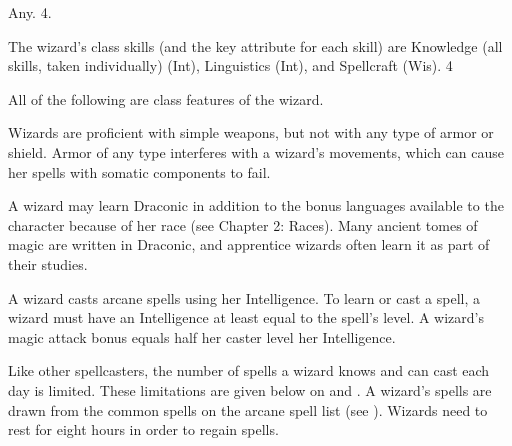  Any.
 4.

The wizard's class skills (and the key attribute for each skill) are
Knowledge (all skills, taken individually) (Int), Linguistics (Int), and Spellcraft (Wis).
 4


All of the following are class features of the wizard.

 Wizards are proficient with simple weapons, but not with any type of armor or shield. Armor of any type interferes with a wizard's movements, which can cause her spells with somatic components to fail.

 A wizard may learn Draconic in addition to the bonus languages available to the character because of her race (see Chapter 2: Races). Many ancient tomes of magic are written in Draconic, and apprentice wizards often learn it as part of their studies.

 A wizard casts arcane spells using her Intelligence. To learn or cast a spell, a wizard must have an Intelligence at least equal to the spell's level. A wizard's magic attack bonus equals half her caster level \add her Intelligence.

Like other spellcasters, the number of spells a wizard knows and can cast each day is limited. These limitations are given below on  and . A wizard's spells are drawn from the common spells on the arcane spell list (see ). Wizards need to rest for eight hours in order to regain spells. 

